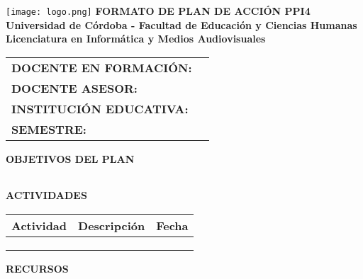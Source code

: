 \documentclass[a4paper,12pt]{article}
\begin{document}
\begin{center}
    \vspace*{1cm}
    \texttt{[image: logo.png]} %
    \vspace{0.5cm}
    \textbf{\Large FORMATO DE PLAN DE ACCIÓN PPI4} \\
    \vspace{0.5cm}
    \textbf{Universidad de Córdoba - Facultad de Educación y Ciencias Humanas} \\
    \textbf{Licenciatura en Informática y Medios Audiovisuales}
\end{center}

\vspace{0.5cm}
\begin{tabularx}{\textwidth}{@{}p{5cm}X@{}}
    \toprule
    \textbf{DOCENTE EN FORMACIÓN:} & \hrulefill \\
    \textbf{DOCENTE ASESOR:} & \hrulefill \\
    \textbf{INSTITUCIÓN EDUCATIVA:} & \hrulefill \\
    \textbf{SEMESTRE:} & \hrulefill \\
    \bottomrule
\end{tabularx}

\vspace{0.5cm}
\noindent
\textbf{OBJETIVOS DEL PLAN}
\begin{tabularx}{\textwidth}{|X|}
    \hline
    \vspace{2cm} \\ \hline
\end{tabularx}

\vspace{0.5cm}
\noindent
\textbf{ACTIVIDADES}
\begin{table}[h]
    \centering
    \scriptsize
    \begin{tabularx}{\textwidth}{|X|X|c|}
        \hline
        \textbf{Actividad} & \textbf{Descripción} & \textbf{Fecha} \\
        \hline
        & & \\ \hline
        & & \\ \hline
        & & \\ \hline
    \end{tabularx}
\end{table}

\vspace{0.5cm}
\noindent
\textbf{RECURSOS}
\begin{tabularx}{\textwidth}{|X|}
    \hline
    \vspace{2cm} \\ \hline
\end{tabularx}
\end{document}
